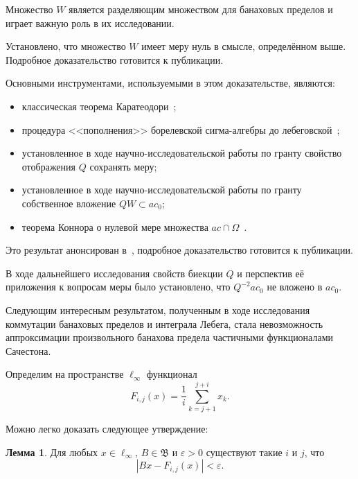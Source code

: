 \documentclass[a4paper,openbib]{report}
\theoremstyle{definition}
\newtheorem{lemma}{Лемма}%
\begin{document}
Множество $W$ является разделяющим множеством для банаховых пределов
и играет важную роль в их исследовании.

Установлено, что множество $W$ имеет меру нуль в смысле, определённом выше.
Подробное доказательство готовится к публикации.

Основными инструментами, используемыми в этом доказательстве, являются:
\begin{itemize}
	\item
		классическая теорема Каратеодори~\cite[Theorem 1.53]{klenke2013probability};
	\item
		процедура <<пополнения>> борелевской сигма-алгебры до лебеговской~\cite[Example 1.71]{klenke2013probability};
	\item
		установленное в ходе научно-исследовательской работы по гранту свойство отображения $Q$ сохранять меру;
	\item
		установленное в ходе научно-исследовательской работы по гранту собственное вложение $QW \subset ac_0$;
	\item
		теорема Коннора о нулевой мере множества $ac\cap\Omega$~\cite{semenov2010characteristic,connor1990almost}.
\end{itemize}

Это результат анонсирован в~\cite{AvSU}, подробное доказательство готовится к публикации.

В ходе дальнейшего исследования свойств биекции $Q$ и перспектив её приложения к вопросам меры было установлено,
что $Q^{-2}ac_0$ не вложено в $ac_0$.

Следующим интересным результатом, полученным в ходе исследования коммутации банаховых пределов и интеграла Лебега,
стала невозможность аппроксимации произвольного банахова предела частичными функционалами Сачестона.

Определим на пространстве $\ell_\infty$ функционал
\begin{equation}
	F_{i,j} (x) =\frac{1}{i} \sum_{k=j+1}^{j+i} x_k
	.
\end{equation}

Можно легко доказать следующее утверждение:

\begin{lemma}
	Для любых $x\in\ell_\infty$, $B\in\mathfrak{B}$ и $\varepsilon>0$ существуют такие $i$ и $j$,
	что
	\begin{equation}
		\label{eq:sucheston_approx_epsilon}
		|Bx - F_{i,j}(x)| < \varepsilon
		.
	\end{equation}
\end{lemma}
\end{document}
